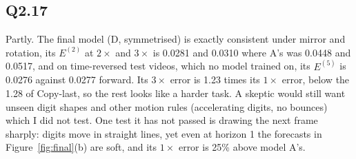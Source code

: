 \documentclass[11pt,letterpaper]{article}
\begin{document}
\subsection*{Q2.17}

Partly. The final model (D, symmetrised) is exactly consistent under mirror and rotation, its $E^{(2)}$ at $2\times$
and $3\times$ is 0.0281 and 0.0310 where A's was 0.0448 and 0.0517, and on time-reversed test videos, which no model
trained on, its $E^{(5)}$ is 0.0276 against 0.0277 forward. Its $3\times$ error is 1.23 times its $1\times$ error,
below the 1.28 of Copy-last, so the rest looks like a harder task. A skeptic would still want unseen digit shapes
and other motion rules (accelerating digits, no bounces) which I did not test. One test it has not passed is drawing
the next frame sharply: digits move in straight lines, yet even at horizon 1 the forecasts in Figure~\ref{fig:final}(b)
are soft, and its $1\times$ error is 25\% above model A's.
\end{document}
